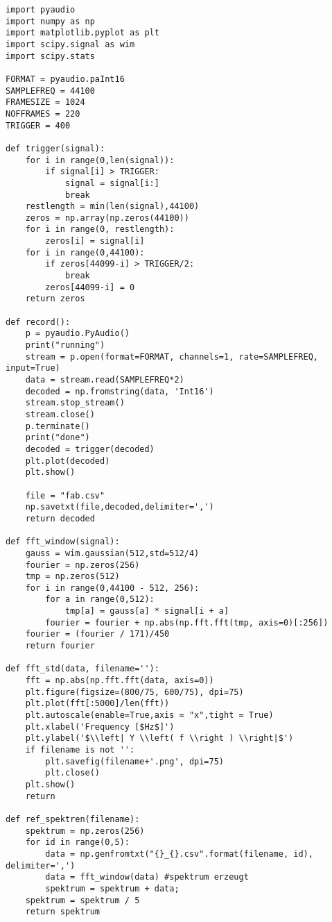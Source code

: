 \begin{lstlisting}[style=PYTHON,frame=single,
 caption=Zum einlesen der Mundharmonika Schwingung
 captionpos=b,
 label=lst:read] 
import pyaudio
import numpy as np
import matplotlib.pyplot as plt
import scipy.signal as wim
import scipy.stats

FORMAT = pyaudio.paInt16
SAMPLEFREQ = 44100
FRAMESIZE = 1024
NOFFRAMES = 220
TRIGGER = 400

def trigger(signal):  
    for i in range(0,len(signal)):
        if signal[i] > TRIGGER:
            signal = signal[i:]
            break
    restlength = min(len(signal),44100)
    zeros = np.array(np.zeros(44100))
    for i in range(0, restlength):
        zeros[i] = signal[i]
    for i in range(0,44100):
        if zeros[44099-i] > TRIGGER/2:
            break
        zeros[44099-i] = 0
    return zeros

def record():
    p = pyaudio.PyAudio()
    print("running")
    stream = p.open(format=FORMAT, channels=1, rate=SAMPLEFREQ, input=True)
    data = stream.read(SAMPLEFREQ*2)
    decoded = np.fromstring(data, 'Int16')
    stream.stop_stream()
    stream.close()
    p.terminate()
    print("done")
    decoded = trigger(decoded)
    plt.plot(decoded)
    plt.show()

    file = "fab.csv"
    np.savetxt(file,decoded,delimiter=',')
    return decoded

def fft_window(signal):
    gauss = wim.gaussian(512,std=512/4)
    fourier = np.zeros(256)
    tmp = np.zeros(512)
    for i in range(0,44100 - 512, 256):
        for a in range(0,512):
            tmp[a] = gauss[a] * signal[i + a]
        fourier = fourier + np.abs(np.fft.fft(tmp, axis=0)[:256])
    fourier = (fourier / 171)/450
    return fourier

def fft_std(data, filename=''):
    fft = np.abs(np.fft.fft(data, axis=0))
    plt.figure(figsize=(800/75, 600/75), dpi=75)
    plt.plot(fft[:5000]/len(fft))  
    plt.autoscale(enable=True,axis = "x",tight = True)
    plt.xlabel('Frequency [$Hz$]')
    plt.ylabel('$\\left| Y \\left( f \\right ) \\right|$')
    if filename is not '':
        plt.savefig(filename+'.png', dpi=75)
        plt.close()
    plt.show()
    return 
    
def ref_spektren(filename):
    spektrum = np.zeros(256)
    for id in range(0,5):
        data = np.genfromtxt("{}_{}.csv".format(filename, id), delimiter=',')
        data = fft_window(data) #spektrum erzeugt
        spektrum = spektrum + data;
    spektrum = spektrum / 5
    return spektrum


\end{lstlisting}
